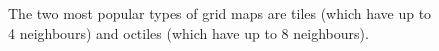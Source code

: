  \begin{figure}[h]
	\centering
	\caption{The two most popular types of grid maps are tiles (which have
up to 4 neighbours) and octiles (which have up to 8 neighbours).}
\vspace{1em}
 \end{figure}
